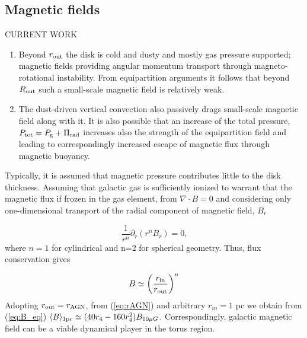 \documentclass[12pt,english,preprint]{aastex}
\newcommand{\red}{\color{red}}
\begin{document}


{\red 

\subsection{Magnetic fields }

CURRENT WORK 
\begin{enumerate}
\item Beyond $r_{{\rm out}}$ the disk is cold and dusty and mostly gas
pressure supported; magnetic fields providing angular momentum transport
through magneto-rotational instability. From equipartition arguments
it follows that beyond $R_{{\rm out}}$ such a small-scale magnetic
field is relatively weak. 
\item The dust-driven vertical convection also passively drags small-scale
magnetic field along with it. It is also possible that an increase
of the total pressure, $P_{{\rm tot}}=P_{{\rm g}}+\Pi_{{\rm rad}}$
increases also the strength of the equipartition field and leading
to correspondingly increased escape of magnetic flux through magnetic
buoyancy. 
\end{enumerate}
Typically, it is assumed that magnetic pressure contributes little
to the disk thickness. Assuming that galactic gas is sufficiently
ionized to warrant that the magnetic flux if frozen in the gas element,
from $\nabla\cdot B=0$ and considering only one-dimensional transport
of the radial component of magnetic field, $B_{r}$

\[
\frac{1}{r^{n}}\partial_{r}(r^{n}B_{r})=0\mbox{{,}}
\]
where $n=1$ for cylindrical and n=2 for spherical geometry. Thus,
flux conservation gives

\begin{equation}
B\simeq\left(\frac{r_{{\rm in}}}{r_{{\rm out}}}\right)^{n}\label{eq:B_eq}
\end{equation}
Adopting $r_{{\rm out}}=r_{{\rm AGN}}$, from (\ref{eq:rAGN}) and
arbitrary $r_{in}=1$ pc we obtain from (\ref{eq:B_eq}) $\langle B\rangle_{1{\rm {pc}}}\simeq(40r_{4}-160r_{4}^{2})B_{10\mu G}$.
Correspondingly, galactic magnetic field can be a viable dynamical
player in the torus region. }
\end{document}
